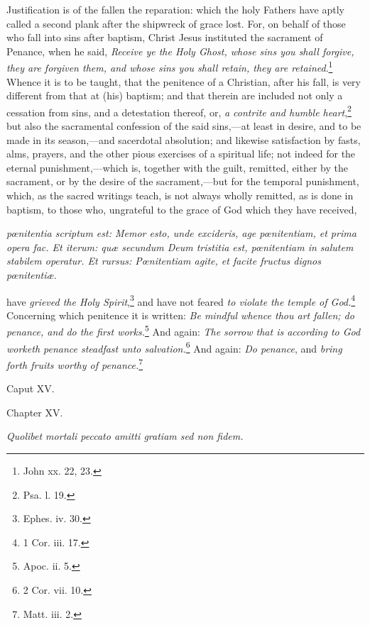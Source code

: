Justification is of the fallen the reparation: which the holy Fathers have aptly called a second plank after the shipwreck of grace lost. For, on behalf of those who fall into sins after baptism, Christ Jesus instituted the sacrament of Penance, when he said, \emph{Receive ye the Holy Ghost, whose sins you shall forgive, they are forgiven them, and whose sins you shall retain, they are retained}.\footnote{\par   John xx. 22, 23.} Whence it is to be taught, that the penitence of a Christian, after his fall, is very different from that at (his) baptism; and that therein are included not only a cessation from sins, and a detestation thereof, or, \emph{a contrite and humble heart},\footnote{\par   Psa. l. 19.} but also the sacramental confession of the said sins,—at least in desire, and to be made in its season,—and sacerdotal absolution; and likewise satisfaction by fasts, alms, prayers, and the other pious exercises of a spiritual life; not indeed for the eternal punishment,—which is, together with the guilt, remitted, either by the sacrament, or by the desire of the sacrament,—but for the temporal punishment, which, as the sacred writings teach, is not always wholly remitted, as is done in baptism, to those who, ungrateful to the grace of God which they have received,

\emph{pœnitentia scriptum est: Memor esto, unde excideris, age pœnitentiam, et prima opera fac. Et iterum: quæ secundum Deum tristitia est, pœnitentiam in salutem stabilem operatur. Et rursus: Pœnitentiam agite, et facite fructus dignos pœnitentiæ.}

have \emph{grieved the Holy Spirit},\footnote{\par   Ephes. iv. 30.} and have not feared \emph{to violate the temple of God.}\footnote{\par   1 Cor. iii. 17.} Concerning which penitence it is written: \emph{Be mindful whence thou art fallen; do penance, and do the first works.}\footnote{\par   Apoc. ii. 5.} And again: \emph{The sorrow that is according to God worketh penance steadfast unto salvation.}\footnote{\par   2 Cor. vii. 10.} And again: \emph{Do penance}, and \emph{bring forth fruits worthy of penance.}\footnote{\par   Matt. iii. 2.}

Caput XV.

Chapter XV.

\emph{Quolibet mortali peccato amitti gratiam sed non fidem.}

